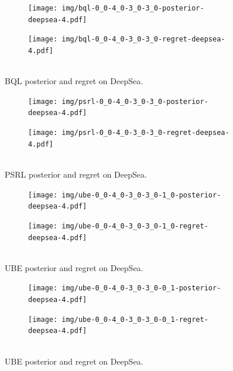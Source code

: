 \documentclass{article}
\begin{document}
\begin{appendices}
\begin{figure}[h!]
\centering
\begin{subfigure}{0.65\textwidth}
\texttt{[image: img/bql-0\_0-4\_0-3\_0-3\_0-posterior-deepsea-4.pdf]}
\end{subfigure}
\begin{subfigure}{0.34\textwidth}
\texttt{[image: img/bql-0\_0-4\_0-3\_0-3\_0-regret-deepsea-4.pdf]}~\\~\\
\end{subfigure}
\captionsetup{width=0.9\linewidth}
\caption{BQL posterior and regret on DeepSea.}\label{bql_deepsea_visual}
\end{figure}

\begin{figure}[h!]
\centering
\begin{subfigure}{0.65\textwidth}
\texttt{[image: img/psrl-0\_0-4\_0-3\_0-3\_0-posterior-deepsea-4.pdf]}
\end{subfigure}
\begin{subfigure}{0.34\textwidth}
\texttt{[image: img/psrl-0\_0-4\_0-3\_0-3\_0-regret-deepsea-4.pdf]}~\\~\\
\end{subfigure}
\captionsetup{width=0.9\linewidth}
\caption{PSRL posterior and regret on DeepSea.}\label{psrl_deepsea_visual}
\end{figure}

\begin{figure}[h!]
\centering
\begin{subfigure}{0.65\textwidth}
\texttt{[image: img/ube-0\_0-4\_0-3\_0-3\_0-1\_0-posterior-deepsea-4.pdf]}
\end{subfigure}
\begin{subfigure}{0.34\textwidth}
\texttt{[image: img/ube-0\_0-4\_0-3\_0-3\_0-1\_0-regret-deepsea-4.pdf]}~\\~\\
\end{subfigure}
\captionsetup{width=0.9\linewidth}
\caption{UBE posterior and regret on DeepSea.}\label{ube_deepsea_visual1}
\end{figure}

\begin{figure}[h!]
\centering
\vspace{-1cm}
\begin{subfigure}{0.65\textwidth}
\texttt{[image: img/ube-0\_0-4\_0-3\_0-3\_0-0\_1-posterior-deepsea-4.pdf]}
\end{subfigure}
\begin{subfigure}{0.34\textwidth}
\texttt{[image: img/ube-0\_0-4\_0-3\_0-3\_0-0\_1-regret-deepsea-4.pdf]}~\\~\\
\end{subfigure}
\captionsetup{width=0.9\linewidth}
\caption{UBE posterior and regret on DeepSea.}\label{ube_deepsea_visual01}
\end{figure}


\end{appendices}
\end{document}

